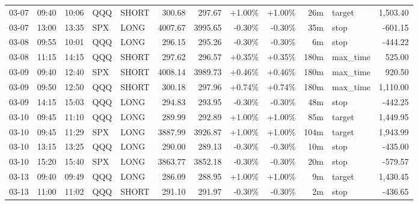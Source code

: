 \documentclass[11pt,a4paper,twoside]{article}
\begin{document}
\begin{center}
\begin{longtable}{>{\color{txtmain}}l l l l l r r r r r >{\color{txtmain}}l r}
03-07 & 09:40 & 10:06 & QQQ & SHORT & 300.68 & 297.67 & \textcolor{wingreen}{+1.00\%} & \textcolor{wingreen}{+1.00\%} & 26m & target & \textcolor{wingreen}{1,503.40} \\
03-07 & 13:00 & 13:35 & SPX & LONG & 4007.67 & 3995.65 & \textcolor{lossred}{-0.30\%} & \textcolor{lossred}{-0.30\%} & 35m & stop & \textcolor{lossred}{-601.15} \\
03-08 & 09:55 & 10:01 & QQQ & LONG & 296.15 & 295.26 & \textcolor{lossred}{-0.30\%} & \textcolor{lossred}{-0.30\%} & 6m & stop & \textcolor{lossred}{-444.22} \\
03-08 & 11:15 & 14:15 & QQQ & SHORT & 297.62 & 296.57 & \textcolor{wingreen}{+0.35\%} & \textcolor{wingreen}{+0.35\%} & 180m & max\_time & \textcolor{wingreen}{525.00} \\
03-09 & 09:40 & 12:40 & SPX & SHORT & 4008.14 & 3989.73 & \textcolor{wingreen}{+0.46\%} & \textcolor{wingreen}{+0.46\%} & 180m & max\_time & \textcolor{wingreen}{920.50} \\
03-09 & 09:50 & 12:50 & QQQ & SHORT & 300.18 & 297.96 & \textcolor{wingreen}{+0.74\%} & \textcolor{wingreen}{+0.74\%} & 180m & max\_time & \textcolor{wingreen}{1,110.00} \\
03-09 & 14:15 & 15:03 & QQQ & LONG & 294.83 & 293.95 & \textcolor{lossred}{-0.30\%} & \textcolor{lossred}{-0.30\%} & 48m & stop & \textcolor{lossred}{-442.25} \\
03-10 & 09:45 & 11:10 & QQQ & LONG & 289.99 & 292.89 & \textcolor{wingreen}{+1.00\%} & \textcolor{wingreen}{+1.00\%} & 85m & target & \textcolor{wingreen}{1,449.95} \\
03-10 & 09:45 & 11:29 & SPX & LONG & 3887.99 & 3926.87 & \textcolor{wingreen}{+1.00\%} & \textcolor{wingreen}{+1.00\%} & 104m & target & \textcolor{wingreen}{1,943.99} \\
03-10 & 13:15 & 13:25 & QQQ & LONG & 290.00 & 289.13 & \textcolor{lossred}{-0.30\%} & \textcolor{lossred}{-0.30\%} & 10m & stop & \textcolor{lossred}{-435.00} \\
03-10 & 15:20 & 15:40 & SPX & LONG & 3863.77 & 3852.18 & \textcolor{lossred}{-0.30\%} & \textcolor{lossred}{-0.30\%} & 20m & stop & \textcolor{lossred}{-579.57} \\
03-13 & 09:40 & 09:49 & QQQ & LONG & 286.09 & 288.95 & \textcolor{wingreen}{+1.00\%} & \textcolor{wingreen}{+1.00\%} & 9m & target & \textcolor{wingreen}{1,430.45} \\
03-13 & 11:00 & 11:02 & QQQ & SHORT & 291.10 & 291.97 & \textcolor{lossred}{-0.30\%} & \textcolor{lossred}{-0.30\%} & 2m & stop & \textcolor{lossred}{-436.65} \\

\end{longtable}
\end{center}
\end{document}
